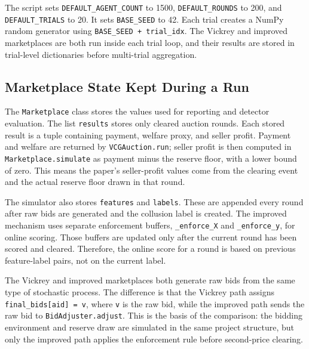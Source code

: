 \documentclass[conference]{IEEEtran}
\begin{document}
The script sets \texttt{DEFAULT\_AGENT\_COUNT} to 1500, \texttt{DEFAULT\_ROUNDS} to 200, and \texttt{DEFAULT\_TRIALS} to 20. It sets \texttt{BASE\_SEED} to 42. Each trial creates a NumPy random generator using \texttt{BASE\_SEED + trial\_idx}. The Vickrey and improved marketplaces are both run inside each trial loop, and their results are stored in trial-level dictionaries before multi-trial aggregation.

\subsection{Marketplace State Kept During a Run}
The \texttt{Marketplace} class stores the values used for reporting and detector evaluation. The list \texttt{results} stores only cleared auction rounds. Each stored result is a tuple containing payment, welfare proxy, and seller profit. Payment and welfare are returned by \texttt{VCGAuction.run}; seller profit is then computed in \texttt{Marketplace.simulate} as payment minus the reserve floor, with a lower bound of zero. This means the paper's seller-profit values come from the clearing event and the actual reserve floor drawn in that round.

The simulator also stores \texttt{features} and \texttt{labels}. These are appended every round after raw bids are generated and the collusion label is created. The improved mechanism uses separate enforcement buffers, \texttt{\_enforce\_X} and \texttt{\_enforce\_y}, for online scoring. Those buffers are updated only after the current round has been scored and cleared. Therefore, the online score for a round is based on previous feature-label pairs, not on the current label.

The Vickrey and improved marketplaces both generate raw bids from the same type of stochastic process. The difference is that the Vickrey path assigns \texttt{final\_bids[aid] = v}, where \texttt{v} is the raw bid, while the improved path sends the raw bid to \texttt{BidAdjuster.adjust}. This is the basis of the comparison: the bidding environment and reserve draw are simulated in the same project structure, but only the improved path applies the enforcement rule before second-price clearing.
\end{document}
